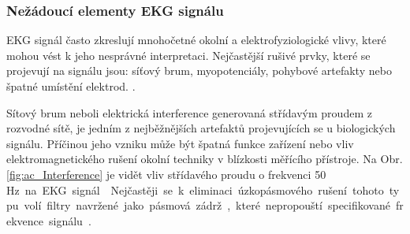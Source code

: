 \subsubsection{Nežádoucí elementy EKG signálu}
\label{section:artifacts_theory}
EKG signál často zkreslují mnohočetné okolní a elektrofyziologické vlivy, které
mohou vést k jeho nesprávné interpretaci. Nejčastější rušivé prvky, které se
projevují na signálu jsou: síťový brum, myopotenciály, pohybové artefakty nebo
špatné umístění elektrod. \cite{Surawicz2008}.

Sítový brum neboli elektrická interference generovaná střídavým proudem z
rozvodné sítě, je jedním z nejběžnějších artefaktů projevujících se u biologických
signálu. Příčinou jeho vzniku může být špatná funkce zařízení nebo
vliv elektromagnetického rušení okolní techniky v blízkosti měřícího přístroje.
Na Obr. \ref{fig:ac_Interference} je vidět vliv střídavého proudu o frekvenci 50
\si\Hz~na EKG signál \cite{Goldberger2017}. Nejčastěji se k eliminaci
úzkopásmového rušení tohoto typu volí filtry navržené jako pásmová zádrž, které
nepropouští specifikované frekvence signálu \cite{Kher2019}.

